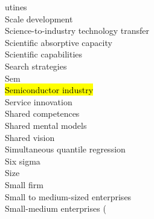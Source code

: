 \documentclass[a4paper]{article}
\begin{document}
\begin{multicols*}{2}
\begin{footnotesize}
utines \\ Scale development \\ Science-to-industry technology transfer \\ Scientific absorptive capacity \\ Scientific capabilities \\ Search strategies \\ Sem \\ \hl{Semiconductor industry} \\ Service innovation \\ Shared competences \\ Shared mental models \\ Shared vision \\ Simultaneous quantile regression \\ Six sigma \\ Size \\ Small firm \\ Small to medium-sized enterprises \\ Small-medium enterprises (
\end{footnotesize}
\end{multicols*}
\end{document}
